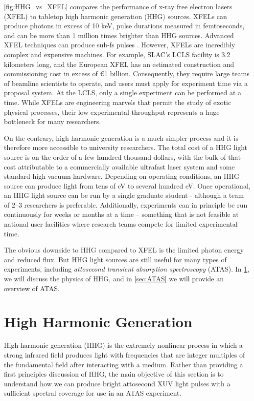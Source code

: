 \cref{fig:HHG_vs_XFEL} compares the performance of x-ray free electron lasers (XFEL) to tabletop high harmonic generation (HHG) sources. XFELs can produce photons in excess of 10 keV, pulse durations measured in femtoseconds, and can be more than 1 million times brighter than HHG sources. Advanced XFEL techniques can produce sub-fs pulses \cite{dingGenerationAttosecondXray2009}. However, XFELs are incredibly complex and expensive machines. For example, SLAC's LCLS facility is 3.2 kilometers long, and the European XFEL has an estimated construction and commissioning cost in excess of \euro1 billion. Consequently, they require large teams of beamline scientists to operate, and users must apply for experiment time via a proposal system. At the LCLS, only a single experiment can be performed at a time. While XFELs are engineering marvels that permit the study of exotic physical processes, their low experimental throughput represents a huge bottleneck for many researchers.

On the contrary, high harmonic generation is a much simpler process and it is therefore more accessible to university researchers. The total cost of a HHG light source is on the order of a few hundred thousand dollars, with the bulk of that cost attributable to a commercially available ultrafast laser system and some standard high vacuum hardware. Depending on operating conditions, an HHG source can produce light from tens of eV to several hundred eV. Once operational, an HHG light source can be run by a single graduate student - although a team of 2--3 researchers is preferable. Additionally, experiments can in principle be run continuously for weeks or months at a time -- something that is not feasible at national user facilities where research teams compete for limited experimental time.

The obvious downside to HHG compared to XFEL is the limited photon energy and reduced flux. But HHG light sources are still useful for many types of experiments, including \textit{attosecond transient absorption spectroscopy} (ATAS). In \cref{sec:HHG}, we will discuss the physics of HHG, and in \cref{sec:ATAS} we will provide an overview of ATAS.

\section{High Harmonic Generation}
\label{sec:HHG}

High harmonic generation (HHG) is the extremely nonlinear process in which a strong infrared field produces light with frequencies that are integer multiples of the fundamental field after interacting with a medium. Rather than providing a first principles discussion of HHG, the main objective of this section is to understand how we can produce bright attosecond XUV light pulses with a sufficient spectral coverage for use in an ATAS experiment.

